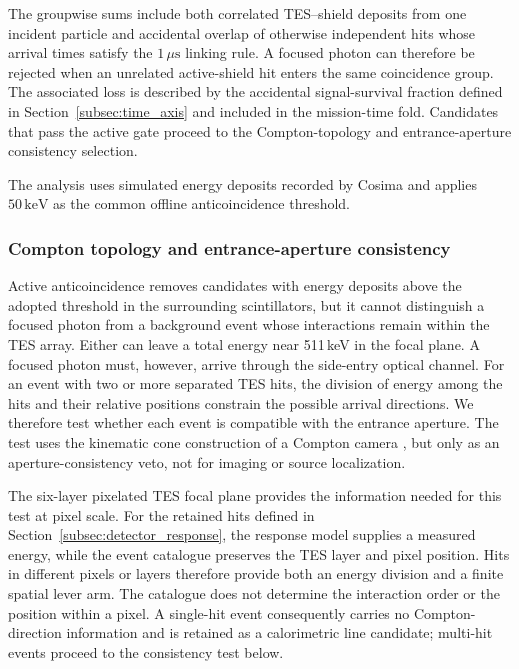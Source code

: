 \documentclass[11pt]{article}
\newcommand{\keV}{\ensuremath{\,\mathrm{keV}}}
\begin{document}
The groupwise sums include both correlated TES--shield deposits from one
incident particle and accidental overlap of otherwise independent hits whose
arrival times satisfy the $1\,\mu\mathrm{s}$ linking rule. A focused photon can
therefore be rejected when an unrelated active-shield hit enters the same
coincidence group. The associated loss is described by the accidental
signal-survival fraction defined in Section~\ref{subsec:time_axis} and included
in the mission-time fold. Candidates that pass the active gate proceed to the
Compton-topology and entrance-aperture consistency selection.

The analysis uses simulated energy deposits recorded by Cosima and applies
$50\keV$ as the common offline anticoincidence threshold.

\subsubsection{Compton topology and entrance-aperture consistency}

Active anticoincidence removes candidates with energy deposits above the adopted
threshold in the surrounding scintillators, but it cannot distinguish a focused photon from a
background event whose interactions remain within the TES array. Either can
leave a total energy near 511\,keV in the focal plane. A focused photon must,
however, arrive through the side-entry optical channel. For an event with two
or more separated TES hits, the division of energy among the hits and their
relative positions constrain the possible arrival directions. We therefore test
whether each event is compatible with the entrance aperture. The test uses the
kinematic cone construction of a Compton camera
\cite{Zoglauer2006}, but only as an aperture-consistency veto, not for imaging
or source localization.

The six-layer pixelated TES focal plane provides the information needed for
this test at pixel scale. For the retained hits defined in
Section~\ref{subsec:detector_response}, the response model supplies a measured
energy, while the event catalogue preserves the TES layer and pixel position.
Hits in different pixels or layers therefore provide both an energy division
and a finite spatial lever arm. The catalogue does not determine the interaction
order or the position within a pixel. A single-hit event consequently carries
no Compton-direction information and is retained as a calorimetric line
candidate; multi-hit events proceed to the consistency test below.
\end{document}
